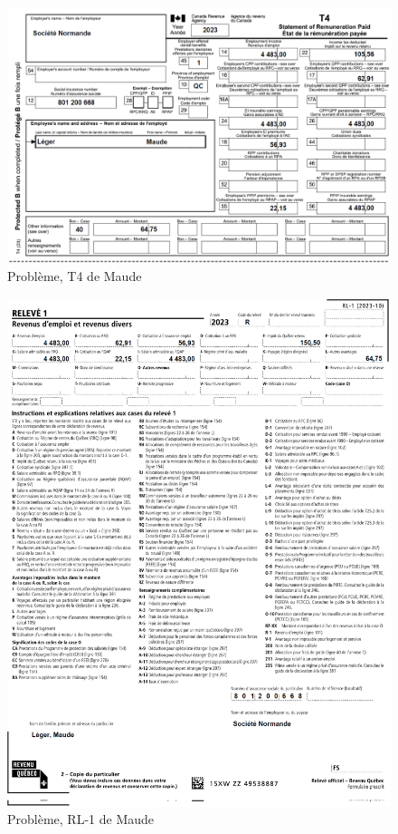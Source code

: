 \begin{figure}
	\centering
	\includegraphics[width=.9\textwidth]{probleme/chapitre-6/Maude-T4.png}
	\caption[]{Problème, T4 de Maude}
	\label{fig:chap6ProblemeMaudeT4}
\end{figure}
\begin{figure}
	\centering
	\includegraphics[width=.9\textwidth]{probleme/chapitre-6/Maude-RL1.png}
	\caption[]{Problème, RL-1 de Maude}
	\label{fig:chap6ProblemeMaudeRL1}
\end{figure}
